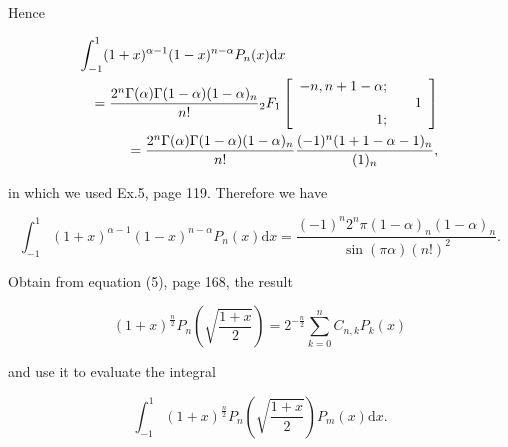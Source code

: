 \begin{solution}
Hence

\begin{eqnarray*}
\lefteqn{\displaystyle\int_{-1}^1 (1+x)^{\alpha-1} (1-x)^{n-\alpha} P_n(x) \mathrm{d}x} \\
& &= \dfrac{2^n \Gamma(\alpha) \Gamma(1-\alpha)(1-\alpha)_n}{n!} {}_2F_1 \left[ \begin{array}{rlr}
-n, n+1-\alpha; & & \\
& & 1 \\
1; & & 
\end{array} \right] \\
& &= \dfrac{2^n \Gamma(\alpha) \Gamma(1-\alpha) (1-\alpha)_n}{n!} \dfrac{(-1)^n (1+1-\alpha-1)_n}{(1)_n},
\end{eqnarray*}

in which we used Ex.5, page 119. Therefore we have

$$\displaystyle\int_{-1}^1 (1+x)^{\alpha-1} (1-x)^{n-\alpha} P_n(x) \mathrm{d}x = \dfrac{(-1)^n 2^n \pi (1-\alpha)_n (1-\alpha)_n}{\sin(\pi \alpha) (n!)^2}.$$
\end{solution}
\begin{problem}\label{problem11chapter10}
Obtain from equation (5), page 168, the result

$$(1+x)^{\frac{n}{2}} P_n \left( \sqrt{\dfrac{1+x}{2}} \right) = 2^{-\frac{n}{2}} \displaystyle\sum_{k=0}^n C_{n,k} P_k(x)$$

and use it to evaluate the integral

$$\displaystyle\int_{-1}^1 (1+x)^{\frac{n}{2}} P_n \left( \sqrt{ \dfrac{1+x}{2}} \right) P_m(x) \mathrm{d}x.$$
\end{problem}
